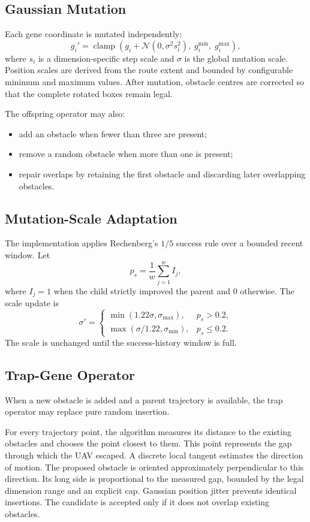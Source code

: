 \documentclass[11pt,a4paper]{report}
\begin{document}
\subsection{Gaussian Mutation}
Each gene coordinate is mutated independently:
\[
g_i'=\operatorname{clamp}\left(g_i+\mathcal{N}\left(0,\sigma^2 s_i^2\right),\;g_i^{\min},\;g_i^{\max}\right),
\]
where $s_i$ is a dimension-specific step scale and $\sigma$ is the global mutation scale. Position scales are derived from the route extent and bounded by configurable minimum and maximum values. After mutation, obstacle centres are corrected so that the complete rotated boxes remain legal.

The offspring operator may also:
\begin{itemize}
  \item add an obstacle when fewer than three are present;
  \item remove a random obstacle when more than one is present;
  \item repair overlaps by retaining the first obstacle and discarding later overlapping obstacles.
\end{itemize}

\subsection{Mutation-Scale Adaptation}
The implementation applies Rechenberg's $1/5$ success rule over a bounded recent window. Let
\[
p_s=\frac{1}{w}\sum_{j=1}^{w} I_j,
\]
where $I_j=1$ when the child strictly improved the parent and $0$ otherwise. The scale update is
\[
\sigma'=
\begin{cases}
\min(1.22\sigma,\sigma_{\max}), & p_s>0.2,\\[2mm]
\max(\sigma/1.22,\sigma_{\min}), & p_s\le 0.2.
\end{cases}
\]
The scale is unchanged until the success-history window is full.

\subsection{Trap-Gene Operator}
When a new obstacle is added and a parent trajectory is available, the trap operator may replace pure random insertion.

For every trajectory point, the algorithm measures its distance to the existing obstacles and chooses the point closest to them. This point represents the gap through which the UAV escaped. A discrete local tangent estimates the direction of motion. The proposed obstacle is oriented approximately perpendicular to this direction. Its long side is proportional to the measured gap, bounded by the legal dimension range and an explicit cap. Gaussian position jitter prevents identical insertions. The candidate is accepted only if it does not overlap existing obstacles.
\end{document}
